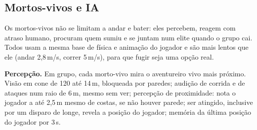 \documentclass[11pt,a4paper]{article}
\begin{document}
\subsection{Mortos-vivos e IA}

Os mortos-vivos não se limitam a andar e bater: eles percebem, reagem com atraso humano, procuram quem sumiu e se juntam num elite quando o grupo cai. Todos usam a mesma base de física e animação do jogador e são mais lentos que ele (andar 2,8\,m/s, correr 5\,m/s), para que fugir seja uma opção real.

\textbf{Percepção.} Em grupo, cada morto-vivo mira o aventureiro vivo mais próximo. Visão em cone de 120\textdegree{} até 14\,m, bloqueada por paredes; audição de corrida e de ataques num raio de 6\,m, mesmo sem ver; percepção de proximidade: nota o jogador a até 2,5\,m mesmo de costas, se não houver parede; ser atingido, inclusive por um disparo de longe, revela a posição do jogador; memória da última posição do jogador por 3\,s.
\end{document}
